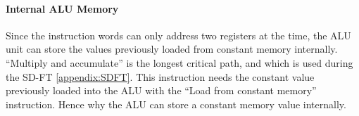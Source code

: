 \paragraph{Internal ALU Memory}

Since the instruction words can only address two registers at the time, the ALU
unit can store the values previously loaded from constant memory internally.
``Multiply and accumulate'' is the longest critical path, and which is used
during the SD-FT \ref{appendix:SDFT}. This instruction needs the constant value
previously loaded into the ALU with the ``Load from constant memory''
instruction. Hence why the ALU can store a constant memory value internally.

